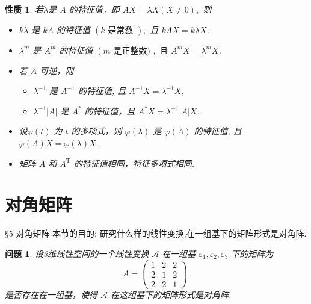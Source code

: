 \documentclass[13pt]{beamer}
\newtheorem*{prop}{性质}
\newtheorem*{qst}{问题}
\def\A{\mathscr{A}}
\begin{document}
\begin{frame}
\begin{prop}
若$\lambda$是 $A$ 的特征值，即 $A X=\lambda X( X \neq 0),$ 则
\begin{itemize}
	\item  $k \lambda$ 是 ${k} {A}$ 的特征值 $({k} \text { 是常数 }),$ 且 ${k} A {X}={k} \lambda {X}$.
	\item $\lambda^{m}$ 是 $A^{m}$ 的特征值 $\left(m \text { 是正整数) }, \text { 且 } A^{m} X=\lambda^{m} X\right.$.
	\item 若 $A$ 可逆，则 
\begin{itemize}
	\item $\lambda^{-1}$ 是 $A^{-1}$ 的特征值, 且 $A^{-1} X=\lambda^{-1} X$, 
	\item $\lambda^{-1}|A|$ 是 $A^{*}$ 的特征值，且 $A^{*} X=\lambda^{-1}|A| X$.
\end{itemize}
	\item 设$\varphi(t)$ 为 $t$ 的多项式，则 $\varphi(\lambda)$ 是 $\varphi(A)$ 的特征值, 且 $\varphi(A) X=\varphi(\lambda) X$.
	\item 矩阵 $A$ 和 $A^{\mathrm{T}}$ 的特征值相同，特征多项式相同.
\end{itemize}
\end{prop}
\end{frame}


\section{对角矩阵}
\begin{frame}{\S 5 对角矩阵}
本节的目的: 研究什么样的线性变换,在一组基下的矩阵形式是对角阵. 
\begin{qst}
设3维线性空间的一个线性变换 $\A$ 在一组基 $\varepsilon_{1}, \varepsilon_{2}, \varepsilon_{3}$ 下的矩阵为 $$A=\left(\begin{array}{ccc}1 & 2 & 2 \\ 2 & 1 & 2 \\ 2 & 2 & 1\end{array}\right).$$
是否存在在一组基，使得 $\A$ 在这组基下的矩阵形式是对角阵. 
\end{qst}



\end{frame}
\end{document}
